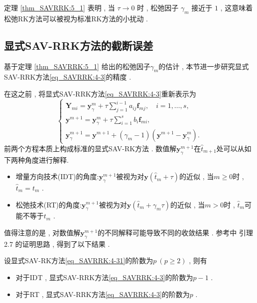 \begin{remark}\label{rk_SAVRRK:5_1}
定理 \ref{thm_SAVRRK:5_1} 表明 , 当 $\tau\rightarrow 0$ 时 , 松弛因子 $\gamma_m$ 接近于 $1$ , 
这意味着松弛RK方法可以被视为标准RK方法的小扰动 . 
\end{remark}

\subsection{显式SAV-RRK方法的截断误差}
基于定理 \ref{thm_SAVRRK:5_1} 给出的松弛因子$\gamma_m$的估计 , 本节进一步研究显式SAV-RRK方法\eqref{eq_SAVRRK:4-3}的精度 . 

在这之前 , 将显式SAV-RRK方法\eqref{eq_SAVRRK:4-3}重新表示为
\begin{equation}
\left\{\begin{array}{l}
\bm{Y}_{m i}=\bm{y}_\gamma^m+\tau \sum\limits_{j=1}^{i-1} a_{i j} \bm{f}_{m j} , \quad i=1 , \ldots , s , \\
\bm{y}^{m+1}=\bm{y}_\gamma^m+\tau \sum\limits_{i=1}^s b_i \bm{f}_{m i} , \\
\bm{y}_\gamma^{m+1}=\bm{y}^{m+1}+\left(\gamma_m-1\right)\left(\bm{y}^{m+1}-\bm{y}_\gamma^m\right)  . 
\end{array}\right . \label{eq_SAVRRK:4-321}
\end{equation}
前两个方程本质上构成标准的显式SAV-RK方法 . 
\newpage
数值解$\bm{y}_\gamma^{m+1}$在$\hat{t}_{m+1}$处可以从如下两种角度进行解释\cite{ketchesonRelaxationRungeKutta2019}.%
\begin{itemize}
\item 增量方向技术(IDT)的角度:$\bm{y}_\gamma^{m+1}$被视为对$\bm{y}\left(\hat{t}_m+\tau\right)$的近似 , 当$m \geq 0$时 , $\hat{t}_m=t_m$ . 
\item 松弛技术(RT)的角度:$\bm{y}_\gamma^{m+1}$被视为对$\bm{y}\left(\hat{t}_m+\gamma_m \tau\right)$的近似 , 当$m>0$时 , $\hat{t}_m$可能不等于$t_m$ . 
\end{itemize}

值得注意的是 , 对数值解$\bm{y}_\gamma^{m+1}$的不同解释可能导致不同的收敛结果 . 
参考\citep{ranochaGeneralRelaxationMethods2020}中 引理 2.7 的证明思路 , 得到了以下结果 . 

\begin{theorem}\label{thm_SAVRRK:5_4}
设显式SAV-RK方法\eqref{eq_SAVRRK:4-31}的阶数为$p~(p \geq 2)$ , 则有
\begin{itemize}
\item 对于IDT , 显式SAV-RRK方法\eqref{eq_SAVRRK:4-3}的阶数为$p-1$ . 
\item 对于RT , 显式SAV-RRK方法\eqref{eq_SAVRRK:4-3}的阶数为$p$ . 
\end{itemize}
\end{theorem}


